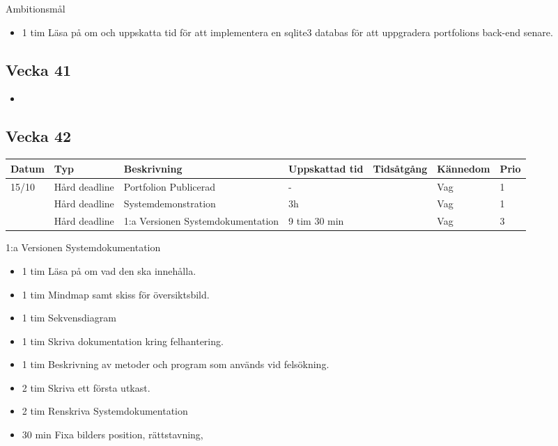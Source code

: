 \documentclass{TDP003mall}
\begin{document}
Ambitionsmål
\begin{itemize}
\item 1 tim Läsa på om och uppskatta tid för att implementera en sqlite3 databas för att uppgradera portfolions back-end senare.
  \end{itemize}

\subsection{Vecka 41}

\begin{itemize}
  \item
\end{itemize}


\subsection{Vecka 42}
\begin{tabularx}{\linewidth}{|l|l|X|l|l|l|l|}
	\hline
	Datum & Typ           & Beskrivning                       & Uppskattad tid & Tidsåtgång & Kännedom & Prio \\ [0.5ex]
	\hline                                             
        15/10 & Hård deadline & Portfolion Publicerad             & -              &            & Vag      & 1    \\
	\hline                                             
          & Hård deadline & Systemdemonstration               & 3h             &            & Vag      & 1    \\
	\hline                                             
          & Hård deadline  & 1:a Versionen Systemdokumentation & 9 tim 30 min             &            & Vag      & 3    \\
	\hline
\end{tabularx}

1:a Versionen Systemdokumentation\\
\begin{itemize}
  \item 1 tim Läsa på om vad den ska innehålla.
  \item 1 tim Mindmap samt skiss för översiktsbild.
  \item 1 tim Sekvensdiagram
  \item 1 tim Skriva dokumentation kring felhantering.
  \item 1 tim Beskrivning av metoder och program som används vid felsökning.
  \item 2 tim Skriva ett första utkast.
  \item 2 tim Renskriva Systemdokumentation
  \item 30 min Fixa bilders position, rättstavning, 
\end{itemize}
\end{document}
